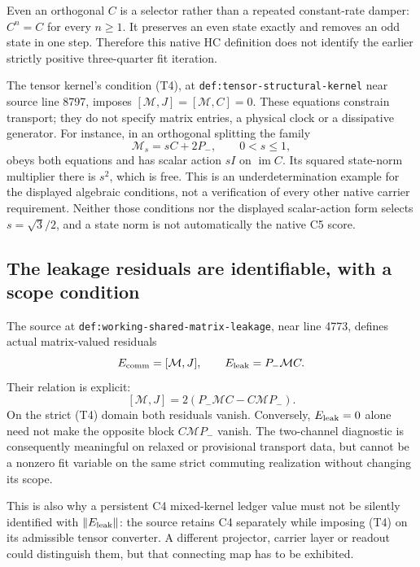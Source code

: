 \documentclass[11pt,a4paper]{article}
\begin{document}
Even an orthogonal $C$ is a selector rather than a repeated constant-rate
damper: $C^n=C$ for every $n\ge1$. It preserves an even state exactly and
removes an odd state in one step. Therefore this native HC definition does
not identify the earlier strictly positive three-quarter fit iteration.

The tensor kernel's condition (T4), at
\texttt{def:tensor-structural-kernel} near source line 8797, imposes
$[\mathcal M,J]=[\mathcal M,C]=0$. These equations constrain transport;
they do not specify matrix entries, a physical clock or a dissipative
generator. For instance, in an orthogonal splitting the family
\[
 \mathcal M_s=sC+2P_-,\qquad 0<s\le1,
\]
obeys both equations and has scalar action $sI$ on $\operatorname{im}C$.
Its squared state-norm multiplier there is $s^2$, which is free. This is
an underdetermination example for the displayed algebraic conditions,
not a verification of every other native carrier requirement. Neither
those conditions nor the displayed scalar-action form selects
$s=\sqrt3/2$, and a state norm is not automatically the native C5 score.

\subsection{The leakage residuals are identifiable, with a scope condition}
The source at \texttt{def:working-shared-matrix-leakage}, near line 4773,
defines actual matrix-valued residuals
\[
 E_{\rm comm}=[\mathcal M,J],\qquad E_{\rm leak}=P_-\mathcal M C.
\]
Their relation is explicit:
\[
 [\mathcal M,J]=2(P_-\mathcal M C-C\mathcal M P_-).
\]
On the strict (T4) domain both residuals vanish. Conversely,
$E_{\rm leak}=0$ alone need not make the opposite block
$C\mathcal M P_-$ vanish. The two-channel diagnostic is consequently
meaningful on relaxed or provisional transport data, but cannot be a
nonzero fit variable on the same strict commuting realization without
changing its scope.

This is also why a persistent C4 mixed-kernel ledger value must not be
silently identified with $\|E_{\rm leak}\|$: the source retains C4
separately while imposing (T4) on its admissible tensor converter.
A different projector, carrier layer or readout could distinguish them,
but that connecting map has to be exhibited.
\end{document}
